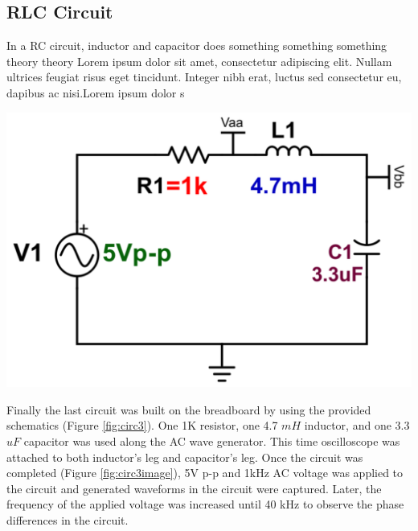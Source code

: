 \documentclass[journal]{IEEEtran}
\begin{document}
\subsection{RLC Circuit}
\noindent In a RC circuit, inductor and capacitor {\color{red}does something something something theory theory Lorem ipsum dolor sit amet, consectetur adipiscing elit. Nullam ultrices feugiat risus eget tincidunt. Integer nibh erat, luctus sed consectetur eu, dapibus ac nisi.Lorem ipsum dolor s}

\begingroup
    \centering
    \medskip
    \includegraphics[width=\columnwidth]{images/lab8_circuit3.png}
    \label{fig:circ3}
    \medskip
\endgroup

\noindent Finally the last circuit was built on the breadboard by using the provided schematics (Figure \ref{fig:circ3}). One 1K resistor, one 4.7 $mH$ inductor, and one 3.3 $uF$ capacitor was used along the AC wave generator. This time oscilloscope was attached to both inductor's leg and capacitor's leg. Once the circuit was completed (Figure \ref{fig:circ3image}), 5V p-p and 1kHz AC voltage was applied to the circuit and generated waveforms in the circuit were captured. Later, the frequency of the applied voltage was increased until 40 kHz to observe the phase differences in the circuit.
\end{document}
